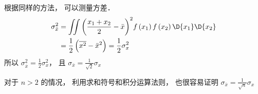 根据同样的方法， 可以测量方差．
  \begin{equation}
  \begin{aligned}
\sigma_{\bar x}^2 &= \iint {{{\left( {\frac{{x_1} + {x_2}}{2} - \bar x} \right)}^2}f\left( {x_1} \right)f\left( {x_2} \right)\D {x_1}\D {x_2}} \\
&= \frac{1}{2}\left( {\overline {x^2}  - {{\bar x}^2}} \right) = \frac{1}{2}\sigma_x^2
\end{aligned} 
\end{equation}
所以 $\sigma_{\bar x}^2 = \frac{1}{2}\sigma_x^2$，  且  ${\sigma_{\bar x}} = \frac{1}{\sqrt 2 }{\sigma_x}$ 

对于 $n > 2$ 的情况， 利用求和符号和积分运算法则， 也很容易证明  ${\sigma_{\bar x}} = \frac{1}{\sqrt n }{\sigma_x}$ 
